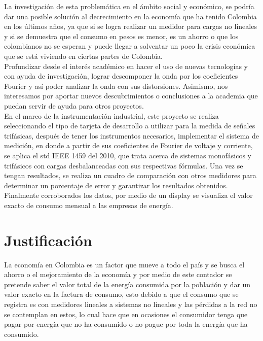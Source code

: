 La investigación de esta problemática en el ámbito social y económico, se podría dar una posible solución al decrecimiento en la economía que ha tenido Colombia en los últimos años, ya que si se logra realizar un medidor para cargas no lineales y si se demuestra que el consumo en pesos es menor, es un ahorro o que los colombianos no se esperan y puede llegar a solventar un poco la crisis económica que se está viviendo en ciertas partes de Colombia.\\

Profundizar desde el interés académico en hacer el uso de nuevas tecnologías y con ayuda de investigación, lograr descomponer la onda por los coeficientes Fourier y así poder analizar la onda con sus distorsiones. Asimismo, nos interesamos por aportar nuevos descubrimientos o conclusiones a la academia que puedan servir de ayuda para otros proyectos.\\

En el marco de la instrumentación industrial, este proyecto se realiza seleccionando el tipo de tarjeta de desarrollo a utilizar para la medida de señales trifásicas, después de tener los instrumentos necesarios, implementar el sistema de medición, en donde a partir de sus coeficientes de Fourier de voltaje y corriente, se aplica el std IEEE 1459 del 2010, que trata acerca de sistemas monofásicos y trifásicos con cargas desbalanceadas con sus respectivas fórmulas. Una vez se tengan resultados, se realiza un cuadro de comparación con otros medidores para determinar un porcentaje de error y garantizar los resultados obtenidos. Finalmente corroborados los datos, por medio de un display se visualiza el valor exacto de consumo mensual a las empresas de energía. \\



\newpage{\cleardoublepage}
\chapter{Justificación}

La economía en Colombia es un factor que mueve a todo el país y se busca el ahorro o el mejoramiento de la economía y por medio de este contador se pretende saber el valor total de la energía consumida por la población y dar un valor exacto en la factura de  consumo, esto debido a que el consumo que se registra es con medidores lineales a sistemas no lineales y las pérdidas a la red no se contemplan en estos, lo cual hace que en ocasiones el consumidor tenga que pagar por energía que no ha consumido o no pague por toda la energía que ha consumido.\\

